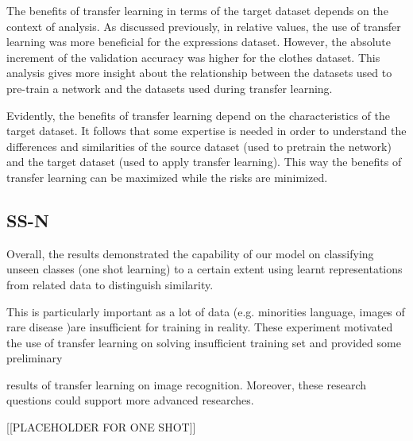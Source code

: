 \documentclass{article}
\begin{document}
The benefits of transfer learning in terms of the target dataset depends on the context of analysis. As discussed previously, in relative values, the use of transfer learning was more beneficial for the expressions dataset. However, the absolute increment of the validation accuracy was higher for the clothes dataset. This analysis gives more insight about the relationship between the datasets used to pre-train a network and the datasets used during transfer learning.     
 
Evidently, the benefits of transfer learning depend on the characteristics of the target dataset. It follows that some expertise is needed in order to understand the differences and similarities of the source dataset (used to pretrain the network) and the target dataset (used to apply transfer learning). This way the benefits of transfer learning can be maximized while the risks are minimized.

\subsection{SS-N}

Overall, the results demonstrated the capability of our model on classifying unseen classes (one shot learning) to a certain extent using learnt representations from related data to distinguish similarity.

This is particularly important as a lot of data (e.g. minorities language, images of rare disease )are insufficient for training in reality. These experiment motivated the use of transfer learning on solving insufficient training set and provided some preliminary 

results of transfer learning on image recognition. Moreover, these research questions could support more advanced researches.

[[PLACEHOLDER FOR ONE SHOT]]


\end{document}
